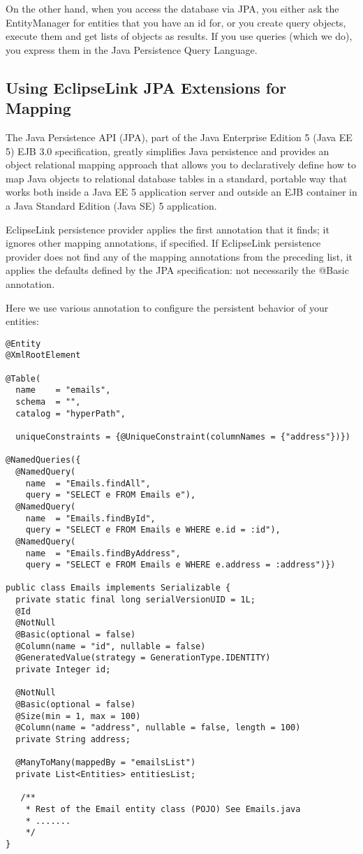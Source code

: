 On the other hand, when you access the database via JPA, you either ask the EntityManager for entities that you have an id for, or you create query objects, execute them and get lists of objects as results. If you use queries (which we do), you express them in the Java Persistence Query Language.

\subsection{Using EclipseLink JPA Extensions for Mapping}
The Java Persistence API (JPA), part of the Java Enterprise Edition 5 (Java EE 5) EJB 3.0 specification, greatly simplifies Java persistence and provides an object relational mapping approach that allows you to declaratively define how to map Java objects to relational database tables in a standard, portable way that works both inside a Java EE 5 application server and outside an EJB container in a Java Standard Edition (Java SE) 5 application.

EclipseLink persistence provider applies the first annotation that it finds; it ignores other mapping annotations, if specified. If EclipseLink persistence provider does not find any of the mapping annotations from the preceding list, it applies the defaults defined by the JPA specification: not necessarily the @Basic annotation. 

Here we use various annotation to configure the persistent behavior of your entities:
\begin{lstlisting}[label=Emails JPA entity,caption=Emails JPA entity]
@Entity
@XmlRootElement

@Table(
  name    = "emails", 
  schema  = "",   
  catalog = "hyperPath", 
  
  uniqueConstraints = {@UniqueConstraint(columnNames = {"address"})})

@NamedQueries({
  @NamedQuery(
    name  = "Emails.findAll", 
    query = "SELECT e FROM Emails e"),
  @NamedQuery(
    name  = "Emails.findById", 
    query = "SELECT e FROM Emails e WHERE e.id = :id"),
  @NamedQuery(
    name  = "Emails.findByAddress", 
    query = "SELECT e FROM Emails e WHERE e.address = :address")})
    
public class Emails implements Serializable {
  private static final long serialVersionUID = 1L;
  @Id
  @NotNull    
  @Basic(optional = false)  
  @Column(name = "id", nullable = false)  
  @GeneratedValue(strategy = GenerationType.IDENTITY)
  private Integer id;

  @NotNull  
  @Basic(optional = false)
  @Size(min = 1, max = 100)
  @Column(name = "address", nullable = false, length = 100)
  private String address;

  @ManyToMany(mappedBy = "emailsList")
  private List<Entities> entitiesList;

   /**
    * Rest of the Email entity class (POJO) See Emails.java
  	* .......
  	*/
}
\end{lstlisting}

